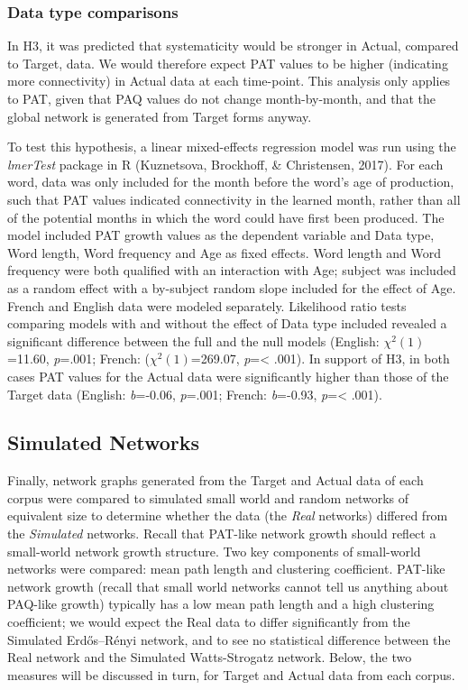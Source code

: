 \documentclass[
  english,
  man,floatsintext]{apa6}
\begin{document}
\hypertarget{data-type-comparisons}{%
\subsubsection{Data type comparisons}\label{data-type-comparisons}}

In H3, it was predicted that systematicity would be stronger in Actual, compared to Target, data. We would therefore expect PAT values to be higher (indicating more connectivity) in Actual data at each time-point. This analysis only applies to PAT, given that PAQ values do not change month-by-month, and that the global network is generated from Target forms anyway.

To test this hypothesis, a linear mixed-effects regression model was run using the \emph{lmerTest} package in R (Kuznetsova, Brockhoff, \& Christensen, 2017). For each word, data was only included for the month before the word's age of production, such that PAT values indicated connectivity in the learned month, rather than all of the potential months in which the word could have first been produced. The model included PAT growth values as the dependent variable and Data type, Word length, Word frequency and Age as fixed effects. Word length and Word frequency were both qualified with an interaction with Age; subject was included as a random effect with a by-subject random slope included for the effect of Age. French and English data were modeled separately. Likelihood ratio tests comparing models with and without the effect of Data type included revealed a significant difference between the full and the null models (English: \(\chi^2 (1)\)=11.60, \emph{p}=.001; French: (\(\chi^2 (1)\)=269.07, \emph{p}=\textless{} .001). In support of H3, in both cases PAT values for the Actual data were significantly higher than those of the Target data (English: \emph{b}=-0.06, \emph{p}=.001; French: \emph{b}=-0.93, \emph{p}=\textless{} .001).

\hypertarget{simulated-networks-1}{%
\subsection{Simulated Networks}\label{simulated-networks-1}}

Finally, network graphs generated from the Target and Actual data of each corpus were compared to simulated small world and random networks of equivalent size to determine whether the data (the \emph{Real} networks) differed from the \emph{Simulated} networks. Recall that PAT-like network growth should reflect a small-world network growth structure. Two key components of small-world networks were compared: mean path length and clustering coefficient. PAT-like network growth (recall that small world networks cannot tell us anything about PAQ-like growth) typically has a low mean path length and a high clustering coefficient; we would expect the Real data to differ significantly from the Simulated Erdős--Rényi network, and to see no statistical difference between the Real network and the Simulated Watts-Strogatz network. Below, the two measures will be discussed in turn, for Target and Actual data from each corpus.
\end{document}
